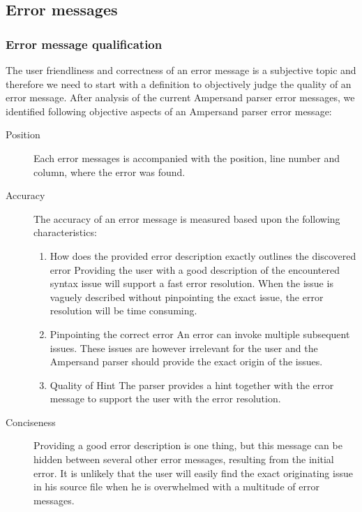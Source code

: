 
\subsection{Error messages}

\subsubsection{Error message qualification}
The user friendliness and correctness of an error message is a subjective topic and therefore we need to start with a definition to objectively judge the quality of an error message.
After analysis of the current Ampersand parser error messages, we identified following objective aspects of an Ampersand parser error message:

\begin{description}
	\item [Position]
	Each error messages is accompanied with the position, line number and column, where the error was found.
	\item [Accuracy]
	The accuracy of an error message is measured based upon the following characteristics:
	\begin{enumerate}
		\item 	How does the provided error description exactly outlines the discovered error
				Providing the user with a good description of the encountered syntax issue will support a fast error resolution.
				When the issue is vaguely described without pinpointing the exact issue, the error resolution will be time consuming.
		\item 	Pinpointing the correct error
				An error can invoke multiple subsequent issues. 
				These issues are however irrelevant for the user and the Ampersand parser should provide the exact origin of the issues.
		\item 	Quality of Hint
			The parser provides a hint together with the error message to support the user with the error resolution.
	\end {enumerate}
    \item[Conciseness]
	Providing a good error description is one thing, but this message can be hidden between several other error messages, resulting from the initial error.
	It is unlikely that the user will easily find the exact originating issue in his source file when he is overwhelmed with a multitude of error messages.
\end {description}

